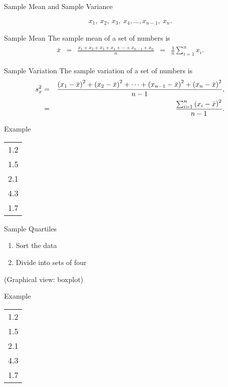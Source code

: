 \begin{frame}{Sample Mean and Sample Variance}

  \begin{eqnarray*}
    x_1,~x_2,~x_3,~x_4,\ldots,x_{n-1},~x_n.
  \end{eqnarray*}

  \begin{definition}{Sample Mean}
    The sample mean of a set of numbers is 
    \begin{eqnarray*}
      \begin{array}{lclcl}
        \bar{x} & = & \frac{x_1+x_2+x_3+x_4+\cdots+x_{n-1}+x_n}{n}
        & = & \frac{1}{n}\sum^n_{i=1} x_i.
    \end{array}
    \end{eqnarray*}
  \end{definition}

  \begin{definition}{Sample Variation}
    The sample variation of a set of numbers is 
    \begin{eqnarray*}
      s^2_x & = & \frac{\left( x_1-\bar{x}\right)^2 + \left( x_2-\bar{x}\right)^2 +
                  \cdots+\left( x_{n-1} - \bar{x} \right)^2 + \left( x_n - \bar{x}\right)^2}{n-1}, \\
      & = & \frac{\sum^n_{i=1} \left( x_i - \bar{x} \right)^2 }{n-1}.
    \end{eqnarray*}
  \end{definition}

  
\end{frame}

\begin{frame}{Example}

  \begin{tabular}{l}
    1.2 \\ 1.5 \\ 2.1 \\ 4.3 \\ 1.7
  \end{tabular}

\end{frame}

\begin{frame}{Sample Quartiles}

  \begin{enumerate}
  \item Sort the data
  \item Divide into sets of four
  \end{enumerate}

  (Graphical view: boxplot)
  
\end{frame}

\begin{frame}{Example}

  \begin{tabular}{l}
    1.2 \\ 1.5 \\ 2.1 \\ 4.3 \\ 1.7
  \end{tabular}

  

\end{frame}



